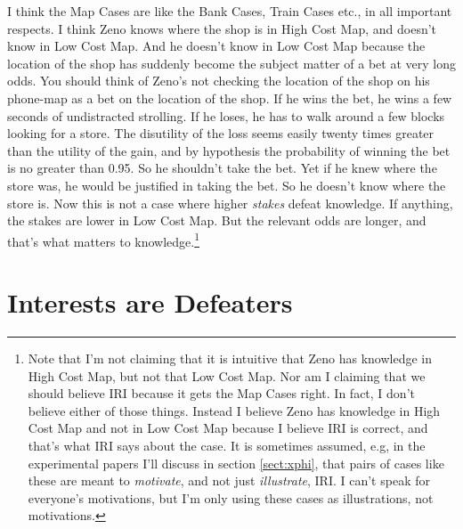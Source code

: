 \documentclass[oneside]{book}
\begin{document}
\noindent I think the Map Cases are like the Bank Cases, Train Cases etc., in all important respects. I think Zeno knows where the shop is in High Cost Map, and doesn't know in Low Cost Map. And he doesn't know in Low Cost Map because the location of the shop has suddenly become the subject matter of a bet at very long odds. You should think of Zeno's not checking the location of the shop on his phone-map as a bet on the location of the shop. If he wins the bet, he wins a few seconds of undistracted strolling. If he loses, he has to walk around a few blocks looking for a store. The disutility of the loss seems easily twenty times greater than the utility of the gain, and by hypothesis the probability of winning the bet is no greater than 0.95. So he shouldn't take the bet. Yet  if he knew where the store was, he would be justified in taking the bet. So he doesn't know where the store is. Now this is not a case where higher \textit{stakes} defeat knowledge. If anything, the stakes are lower in Low Cost Map. But the relevant odds are longer, and that's what matters to knowledge.\footnote{Note that I'm not claiming that it is intuitive that Zeno has knowledge in High Cost Map, but not that Low Cost Map. Nor am I claiming that we should believe IRI because it gets the Map Cases right. In fact, I don't believe either of those things. Instead I believe Zeno has knowledge in High Cost Map and not in Low Cost Map because I believe IRI is correct, and that's what IRI says about the case. It is sometimes assumed, e.g, in the experimental papers I'll discuss in section \ref{sect:xphi}, that pairs of cases like these are meant to \textit{motivate}, and not just \textit{illustrate}, IRI. I can't speak for everyone's motivations, but I'm only using these cases as illustrations, not motivations.}

\section{Interests are Defeaters} \label{sect:defeat}
\end{document}
